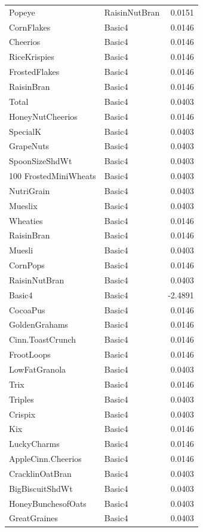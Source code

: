 \begin{longtable}{llr}
Popeye & RaisinNutBran & 0.0151 \\
CornFlakes & Basic4 & 0.0146 \\
Cheerios & Basic4 & 0.0146 \\
RiceKrispies & Basic4 & 0.0146 \\
FrostedFlakes & Basic4 & 0.0146 \\
RaisinBran & Basic4 & 0.0146 \\
Total & Basic4 & 0.0403 \\
HoneyNutCheerios & Basic4 & 0.0146 \\
SpecialK & Basic4 & 0.0403 \\
GrapeNuts & Basic4 & 0.0403 \\
SpoonSizeShdWt & Basic4 & 0.0403 \\
100%
FrostedMiniWheats & Basic4 & 0.0403 \\
NutriGrain & Basic4 & 0.0403 \\
Mueslix & Basic4 & 0.0403 \\
Wheaties & Basic4 & 0.0146 \\
RaisinBran & Basic4 & 0.0146 \\
Muesli & Basic4 & 0.0403 \\
CornPops & Basic4 & 0.0146 \\
RaisinNutBran & Basic4 & 0.0403 \\
Basic4 & Basic4 & -2.4891 \\
CocoaPus & Basic4 & 0.0146 \\
GoldenGrahams & Basic4 & 0.0146 \\
Cinn.ToastCrunch & Basic4 & 0.0146 \\
FrootLoops & Basic4 & 0.0146 \\
LowFatGranola & Basic4 & 0.0403 \\
Trix & Basic4 & 0.0146 \\
Triples & Basic4 & 0.0403 \\
Crispix & Basic4 & 0.0403 \\
Kix & Basic4 & 0.0146 \\
LuckyCharms & Basic4 & 0.0146 \\
AppleCinn.Cheerios & Basic4 & 0.0146 \\
CracklinOatBran & Basic4 & 0.0403 \\
BigBiscuitShdWt & Basic4 & 0.0403 \\
HoneyBunchesofOats & Basic4 & 0.0403 \\
GreatGraines & Basic4 & 0.0403 \\

\end{longtable}
